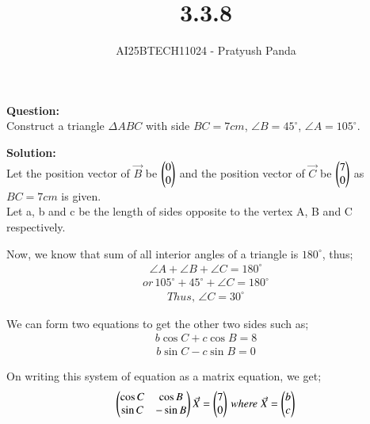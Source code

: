 \documentclass[journal]{IEEEtran}
\begin{document}

\vspace{3cm}

\title{3.3.8}
\author{AI25BTECH11024 - Pratyush Panda
}
\maketitle
{\let\newpage\relax\maketitle}

\renewcommand{\thefigure}{\theenumi}
\renewcommand{\thetable}{\theenumi}
\setlength{\intextsep}{10pt} %


\renewcommand{\thetable}{\theenumi}

\textbf{Question: } \\
Construct a triangle $\Delta ABC$ with side $BC = 7 cm$, $\angle B=45^\circ$, $\angle A=105^\circ$.
\vspace{0.7cm}

\textbf{Solution: } \\
Let the position vector of $\Vec{B}$ be $\begin{pmatrix}0 \\ 0\end{pmatrix}$ and the position vector of $\Vec{C}$ be $\begin{pmatrix}7 \\ 0\end{pmatrix}$ as $BC=7cm$ is given.\\
Let a, b and c be the length of sides opposite to the vertex A, B and C respectively.

Now, we know that sum of all interior angles of a triangle is $180^\circ$, thus;
\begin{align}
\angle A + \angle B + \angle C = 180^\circ
\end{align}
\begin{align}
or \, 105^\circ + 45^\circ + \angle C = 180^\circ
\end{align}
\begin{align}
Thus, \, \angle C = 30^\circ
\end{align}

We can form two equations to get the other two sides such as;
\begin{align}
b\cos C + c\cos B = 8
\end{align}
\begin{align}
b\sin C - c\sin B = 0
\end{align}

On writing this system of equation as a matrix equation, we get;
\begin{align}
\begin{pmatrix}\cos C & \cos B \\
       \sin C & -\sin B\end{pmatrix}
\Vec{X} = 
\begin{pmatrix}7 \\ 0\end{pmatrix} \, \textit{where } \Vec{X}=\begin{pmatrix}b \\ c\end{pmatrix}
\end{align}
\end{document}
